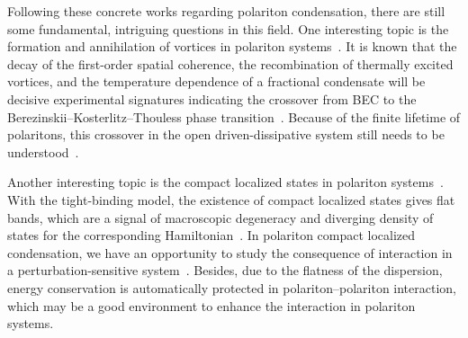 %
%

Following these concrete works regarding polariton condensation, there are still some fundamental, intriguing questions in this field.
One interesting topic is the formation and annihilation of vortices in polariton systems~\cite{Keeling:2008js,Lagoudakis:2008aa,Tosi:2011kv,Kwon:2019aa}.
It is known that the decay of the first-order spatial coherence, the recombination of thermally excited vortices, and the temperature dependence of a fractional condensate will be decisive experimental signatures indicating the crossover from BEC to the Berezinskii--Kosterlitz--Thouless phase transition~\cite{Kosterlitz_1972,Kosterlitz_1973,berezinsky1970destruction,berezinsky1972destruction}.
Because of the finite lifetime of polaritons, this crossover in the open driven-dissipative system still needs to be understood~\cite{Roumpos2012}.

Another interesting topic is the compact localized states in polariton systems~\cite{Huber:2010aa,Jacqmin:2014aa,Whittaker:2018ab,Klembt:2017aa}.
With the tight-binding model, the existence of compact localized states gives flat bands, which are a signal of macroscopic degeneracy and diverging density of states for the corresponding Hamiltonian~\cite{Leykam:2018aa,Leykam:2018ab}.
In polariton compact localized condensation, we have an opportunity to study the consequence of interaction in a perturbation-sensitive system~\cite{Kuno_2020,danieli2020manybody}.
Besides, due to the flatness of the dispersion, energy conservation is automatically protected in polariton--polariton interaction, which may be a good environment to enhance the interaction in polariton systems.

